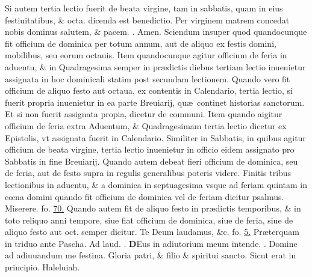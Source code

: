 \documentclass[a5paper,10pt]{book}
\makeatletter
\DeclareRobustCommand{\Vbar}{\vers@resp{-0.1em}{V}}
\DeclareRobustCommand{\Rbar}{\vers@resp{0pt}{R}}
\newcommand{\vers@resp@sym}{\raisebox{0.2ex}{\rotatebox[origin=c]{-20}{$\m@th\rceil$}}}
\newcommand{\vers@resp}[2]{%
  {\ooalign{\hidewidth\kern#1\vers@resp@sym\hidewidth\cr#2\cr}}%
}%
\def\ae{æ}
\def\oe{œ}
\makeatother
\begin{document}
\begin{multicols*}{2}
\newline {} \color{red} Si autem tertia lectio fuerit de beata virgine, tam in sabbatis, quam in eius festiuitatibus, \& octa. dicenda est benedictio. \color{black} Per virginem matrem concedat nobis dominus salutem, \& pacem. \color{red} \Rbar . \color{black} Amen.
\newline {} \color{red} Sciendum insuper quod quandocunque fit officium de dominica per totum annum, aut de aliquo ex festis domini, mobilibus, seu eorum octauis. \color{black}
\newline {} \color{red} Item quandocunque agitur officium de feria in aduentu, \& in Quadragesima semper in pr\ae dictis diebus tertiam lectio inuenietur assignata in hoc dominicali statim post secundam lectionem. Quando vero fit officium de aliquo festo aut octaua, ex contentis in Calendario, tertia lectio, si fuerit propria inuenietur in ea parte Breuiarij, qu\ae \ continet historias sanctorum. Et si non fuerit assignata propia, dicetur de communi. \color{black}
\newline {} \color{red} Item quando aigitur officium de feria extra Aduentum, \& Quadragesimam tertia lectio dicetur ex Epistolis, vt assignata fuerit in Calendario. Similiter in Sabbatis, in quibus agitur officium de beata virgine, tertia lectio inuenietur in officio eidem assignato pro Sabbatis in fine Breuiarij. Quando autem debeat fieri officium de dominica, seu de feria, aut de festo supra in regulis generalibus poteris videre. Finitis tribus lectionibus in aduentu, \& a dominica in septuagesima vsque ad feriam quintam in c\oe na domini quando fit officium de dominica vel de feriam dicitur psalmus. \color{black} Miserere. fo. \hyperlink{ps50}{70.} \color{red} Quando autem fit de aliquo festo in pr\ae dictis temporibus, \& in toto reliquo anni tempore, siue fiat officium de dominica, siue de feria, siue de aliquo festo aut oct. semper dicitur. \color{black} Te Deum laudamus, \&c. fo. \hyperlink{tedeum}{5.} \color{red} Pr\ae terquam in triduo ante Pascha. \hypertarget{DOM-PRIMA-ADV-LAVD}{Ad laud.} \Vbar . \color{black}
\vspace{-.5em}
\lettrine[lines=2]{\bfseries D}{}Eus in adiutorium meum intende. \color{red} \Rbar . \color{black} Domine ad adiuuandum me festina. \color{red} G\color{black}loria patri, \& filio \& spiritui sancto. Sicut erat in principio. Haleluiah.

\end{multicols*}
\end{document}
